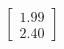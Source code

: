\documentclass[preview]{standalone}
\begin{document}
\begin{align*}
\begin{bmatrix} 1.99 \\ 2.40 \end{bmatrix}
\end{align*}
\end{document}
